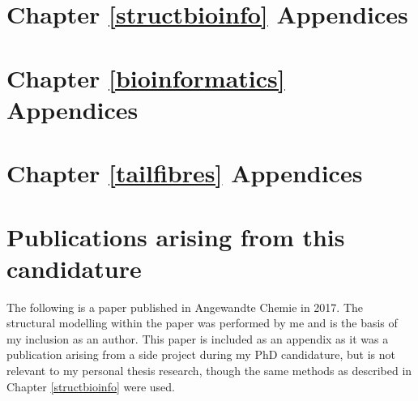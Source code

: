 \documentclass[a4paper, oneside, 11pt]{report} %
\begin{document}
\begin{appendices}
\chapter{Chapter \ref{structbioinfo} Appendices}

\chapter{Chapter \ref{bioinformatics} Appendices}
%

\chapter{Chapter \ref{tailfibres} Appendices}


\chapter{Publications arising from this candidature}
The following is a paper published in Angewandte Chemie in 2017. The structural modelling within the paper was performed by me and is the basis of my inclusion as an author. This paper is included as an appendix as it was a publication arising from a side project during my PhD candidature, but is not relevant to my personal thesis research, though the same methods as described in Chapter \ref{structbioinfo} were used.

%


\end{appendices}

\newpage
{}
\newpage
\listoftodos[To Do]
\end{document}
